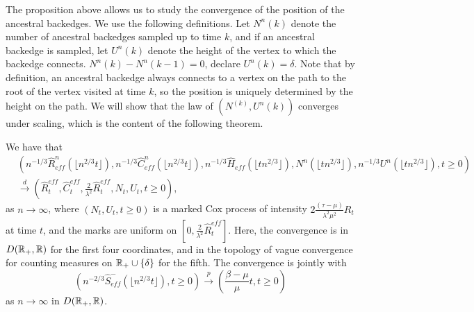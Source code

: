 The proposition above allows us to study the convergence of the position of the ancestral backedges. We use the following definitions. Let $N^n(k)$ denote the number of ancestral backedges sampled up to time $k$, and if an ancestral backedge is sampled, let $U^n(k)$ denote the height of the vertex to which the backedge connects. $N^n(k)-N^n(k-1)=0$, declare $U^n(k)=\delta$. Note that by definition, an ancestral backedge always connects to a vertex on the path to the root of the vertex visited at time $k$, so the position is uniquely determined by the height on the path. We will show that the law of $(N^(k),U^n(k))$ converges under scaling, which is the content of the following theorem. 

\begin{theorem}
We have that 
\begin{align*}&\left(n^{-1/3}\hat{R}^n_{eff}\left(\lfloor n^{2/3}t\rfloor\right),n^{-1/3}\hat{C}^n_{eff}\left(\lfloor n^{2/3}t\rfloor\right),n^{-1/3}\hat{H}_{eff}\left(\lfloor tn^{2/3}\rfloor\right), N^n\left(\lfloor tn^{2/3}\rfloor\right), n^{-1/3}U^n\left(\lfloor tn^{2/3}\rfloor\right),t\geq 0\right)\\
&\overset{d}{\to}\left(\hat{R}^{eff}_t,\hat{C}^{eff}_t, \frac{2}{\lambda^2}\hat{R}^{eff}_t, N_t,U_t,t\geq 0\right),\end{align*}
as $n\to \infty$, where $(N_t,U_t,t\geq 0)$ is a marked Cox process of intensity $2\frac{(\tau-\mu)}{\lambda^2\mu^2}R_t$ at time $t$, and the marks are uniform on $[0,\frac{2}{\lambda^2}\hat{R}^{eff}_t]$. Here, the convergence is in $D({\mathbb R}_+,{\mathbb R})$ for the first four coordinates, and in the topology of vague convergence for counting measures on ${\mathbb R}_+\cup \{\delta\}$ for the fifth. The convergence is jointly with 
$$\left(n^{-2/3}\hat{S}^-_{eff}\left(\lfloor n^{2/3}t\rfloor \right), t\geq 0\right)\overset{p}{\to}\left(\frac{\beta-\mu}{\mu}t, t\geq 0\right)$$ 
as $n\to \infty$ in $D({\mathbb R}_+,{\mathbb R})$.
\end{theorem}
